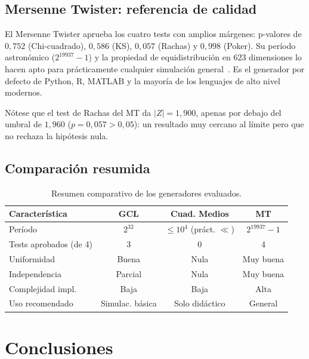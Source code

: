 \documentclass[a4paper, 11pt]{article}
\begin{document}
\subsection{Mersenne Twister: referencia de calidad}

El Mersenne Twister aprueba los cuatro tests con amplios márgenes:
p-valores de $0{,}752$ (Chi-cuadrado), $0{,}586$ (KS), $0{,}057$ (Rachas)
y $0{,}998$ (Poker). Su período astronómico ($2^{19937}-1$) y la propiedad de
equidistribución en 623 dimensiones lo hacen apto para prácticamente cualquier
simulación general~\cite{matsumoto1998mersenne}. Es el generador por defecto
de Python, R, MATLAB y la mayoría de los lenguajes de alto nivel modernos.

Nótese que el test de Rachas del MT da $|Z| = 1{,}900$, apenas por debajo del
umbral de $1{,}960$ ($p = 0{,}057 > 0{,}05$): un resultado muy cercano al límite
pero que no rechaza la hipótesis nula.

\subsection{Comparación resumida}

\begin{table}[H]
  \centering
  \caption{Resumen comparativo de los generadores evaluados.}
  \label{tab:comparacion}
  \begin{tabular}{lccc}
    \toprule
    Característica         & GCL      & Cuad. Medios & MT \\
    \midrule
    Período                & $2^{32}$ & $\leq 10^4$ (práct. $\ll$) & $2^{19937}-1$ \\
    Tests aprobados (de 4) & 3        & 0            & 4 \\
    Uniformidad            & Buena    & Nula         & Muy buena \\
    Independencia          & Parcial  & Nula         & Muy buena \\
    Complejidad impl.      & Baja     & Baja         & Alta \\
    Uso recomendado        & Simulac. básica & Solo didáctico & General \\
    \bottomrule
  \end{tabular}
\end{table}


\section{Conclusiones}
\end{document}

